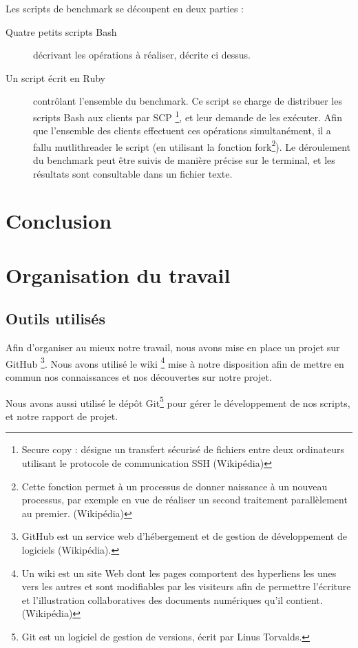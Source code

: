 \documentclass[12pt]{report}
\begin{document}
			Les scripts de benchmark se découpent en deux parties :
			\begin{description}
				\item[Quatre petits scripts Bash ]décrivant les opérations à réaliser, décrite ci dessus.
				\item[Un script écrit en Ruby] contrôlant l'ensemble du benchmark.
				Ce script se charge de distribuer les scripts Bash aux clients par SCP
				\footnote{Secure copy : désigne un transfert sécurisé de fichiers entre deux ordinateurs utilisant le protocole de communication SSH (Wikipédia)},
				et leur demande de les exécuter. Afin que l'ensemble des clients effectuent ces opérations simultanément, il a fallu mutlithreader le script
				(en utilisant la fonction fork\footnote{Cette fonction permet à un processus de donner naissance à un nouveau processus,
				par exemple en vue de réaliser un second traitement parallèlement au premier. (Wikipédia)}).
				Le déroulement du benchmark peut être suivis de manière précise sur le terminal, et les résultats sont consultable dans un fichier texte.
			\end{description}


	\chapter{Conclusion}

	\appendix
		\chapter{Organisation du travail}
			\section{Outils utilisés}
				Afin d'organiser au mieux notre travail, nous avons mise en place un projet sur GitHub
				\footnote{GitHub est un service web d'hébergement et de gestion de développement de logiciels (Wikipédia).}.
				Nous avons utilisé le wiki
				\footnote{Un wiki est un site Web dont les pages comportent des hyperliens les unes vers les autres
				et sont modifiables par les visiteurs afin de permettre l'écriture et l'illustration collaboratives des documents numériques qu'il contient. (Wikipédia)}
				mise à notre disposition afin de mettre en commun nos connaissances et nos découvertes sur notre projet.

				Nous avons aussi utilisé le dépôt Git\footnote{Git est un logiciel de gestion de versions, écrit par Linus Torvalds.} pour gérer le développement
				de nos scripts, et notre rapport de projet.
\newpage
\end{document}
